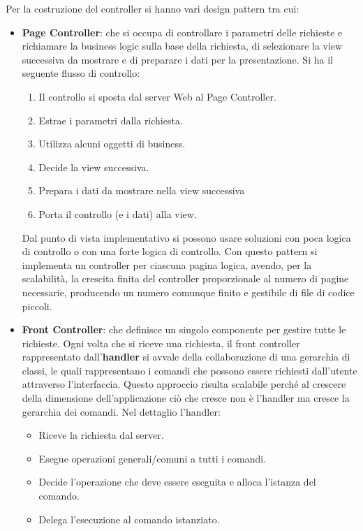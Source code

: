 Per la costruzione del controller si hanno vari design pattern tra cui:
\begin{itemize}
    \item \textbf{Page Controller}: che si occupa di controllare i parametri delle richieste e richiamare la business logic sulla base della richiesta, di selezionare la view successiva da mostrare e di preparare i dati per la presentazione. Si ha il seguente flusso di controllo:
    \begin{enumerate}
        \item Il controllo si sposta dal server Web al Page Controller.
        \item Estrae i parametri dalla richiesta.
        \item Utilizza alcuni oggetti di business.
        \item Decide la view successiva.
        \item Prepara i dati da mostrare nella view successiva
        \item Porta il controllo (e i dati) alla view.
    \end{enumerate}
    Dal punto di vista implementativo si possono usare soluzioni con poca logica di controllo o con una forte logica di controllo. Con questo pattern si implementa un controller per ciascuna pagina logica, avendo, per la scalabilità, la crescita finita del controller proporzionale al numero di pagine necessarie, producendo un numero comunque finito e gestibile di file di codice piccoli.
    \item \textbf{Front Controller}: che definisce un singolo componente per gestire tutte le richieste. Ogni volta che si riceve una richiesta, il front controller rappresentato dall'\textbf{handler} si avvale della collaborazione di una gerarchia di classi, le quali rappresentano i comandi che possono essere richiesti dall'utente attraverso l'interfaccia. Questo approccio risulta scalabile perché al crescere della dimensione dell'applicazione ciò che cresce non è l'handler ma cresce la gerarchia dei comandi. Nel dettaglio l'handler:
    \begin{itemize}
        \item Riceve la richiesta dal server.
        \item Esegue operazioni generali/comuni a tutti i comandi.
        \item Decide l'operazione che deve essere eseguita e alloca l'istanza del comando.
        \item Delega l'esecuzione al comando istanziato.
    \end{itemize}

\end{itemize}

